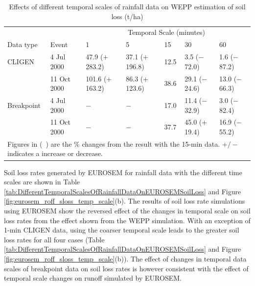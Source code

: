 \begin{table}[htbp]
  \centering
  \footnotesize
  \caption[Effects of different temporal scales of rainfall data on WEPP
estimation of soil loss]{Effects of different temporal scales of rainfall data
on WEPP estimation of soil loss (t/ha)}
  \label{tab:DifferentTemporalScalesOfRainfallDataOnWEPPSoilLossEstimation}
    \begin{tabular}{lllllll}
    \toprule
    & & \multicolumn{5}{c}{Temporal Scale (minutes)}\\
      \cmidrule{3-7}
    Data type & Event & 1 & 5 & 15 & 30 & 60 \\
    \midrule
    CLIGEN & 4 Jul 2000 & 47.9 ($+$283.2) & 37.1 ($+$196.8) & 12.5 & 3.5
($-$72.0) & 1.6 ($-$87.2) \\
     & 11 Oct 2000 & 101.6 ($+$163.2) & 86.3 ($+$123.6) & 38.6 & 29.1 ($-$24.6)
& 13.0 ($-$66.3) \\
     \midrule
    Breakpoint & 4 Jul 2000 & $-$ & $-$ & 17.0 & 11.4 ($-$32.9) & 3.0 ($-$82.4)
\\
     & 11 Oct 2000 & $-$ & $-$ & 37.7 & 45.0 ($+$19.4) & 16.9 ($-$55.2) \\
    \bottomrule
    \multicolumn{7}{p{13cm}}{\footnotesize Figures in (\ ) are the \% changes
from the result with the 15-min data. $+/-$ indicates a increase or decrease.}\\
    \end{tabular}
\end{table}


Soil loss rates generated by EUROSEM for rainfall data with the different time
scales are shown in Table
\ref{tab:DifferentTemporalScalesOfRainfallDataOnEUROSEMSoilLoss} and Figure
\ref{fig:eurosem_roff_sloss_temp_scale}(b). The results of soil loss rate
simulations using EUROSEM show the reversed effect of the changes in temporal
scale on soil loss rates from the effect shown from the WEPP simulation. With an
exception of 1-min CLIGEN data, using the coarser temporal scale leads to the
greater soil loss rates for all four cases (Table
\ref{tab:DifferentTemporalScalesOfRainfallDataOnEUROSEMSoilLoss} and Figure
\ref{fig:eurosem_roff_sloss_temp_scale}(b)). The effect of changes in
temporal data scales of breakpoint data on soil loss rates is however
consistent with the effect of temporal scale changes on runoff simulated by
EUROSEM.

